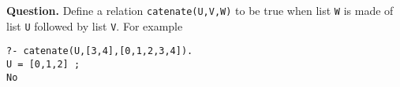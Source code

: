\noindent\textbf{Question.} Define a relation
    \texttt{catenate(U,V,W)} to be true when list \texttt{W} is made
    of list \texttt{U} followed by list \texttt{V}. For example
{\small 
\begin{verbatim}
?- catenate(U,[3,4],[0,1,2,3,4]).
U = [0,1,2] ;
No
\end{verbatim}
}
